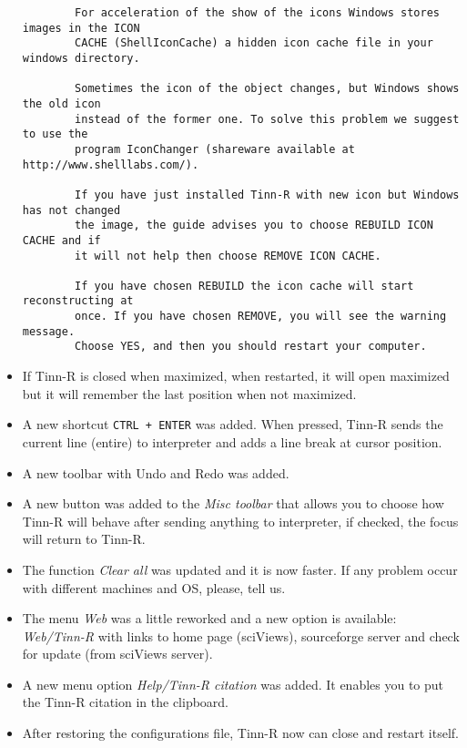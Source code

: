 \begin{itemize}
\begin{footnotesize}
\begin{verbatim}
        For acceleration of the show of the icons Windows stores images in the ICON
        CACHE (ShellIconCache) a hidden icon cache file in your windows directory.

        Sometimes the icon of the object changes, but Windows shows the old icon
        instead of the former one. To solve this problem we suggest to use the
        program IconChanger (shareware available at http://www.shelllabs.com/).

        If you have just installed Tinn-R with new icon but Windows has not changed
        the image, the guide advises you to choose REBUILD ICON CACHE and if
        it will not help then choose REMOVE ICON CACHE.

        If you have chosen REBUILD the icon cache will start reconstructing at
        once. If you have chosen REMOVE, you will see the warning  message.
        Choose YES, and then you should restart your computer.
      \end{verbatim}
    \end{footnotesize}

  \item If Tinn-R is closed when maximized, when restarted, it will open
    maximized but it will remember the last position when not maximized.
  \item A new shortcut \texttt{CTRL + ENTER} was added. When pressed, Tinn-R
    sends the current line (entire) to \RR{} interpreter and adds a line break
    at cursor position.
  \item A new toolbar with Undo and Redo was added.
  \item A new button was added to the \textit{Misc toolbar} that allows
    you to choose how Tinn-R will behave after sending anything to \RR{}
    interpreter, if checked, the focus will return to Tinn-R.
  \item The function \textit{Clear all} was updated and it is now faster.
    If any problem occur with different machines and OS, please, tell us.
  \item The menu \textit{Web} was a little reworked and a new option is
    available: \textit{Web/Tinn-R} with links to home page (sciViews),
    sourceforge server and check for update (from sciViews server).
  \item A new menu option \textit{Help/Tinn-R citation} was added. It enables
    you to put the Tinn-R citation in the clipboard.
  \item After restoring the configurations file, Tinn-R now can
    close and restart itself.
\end{itemize}


